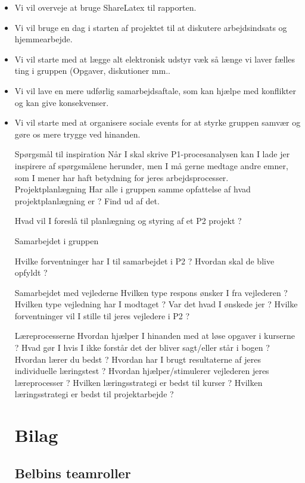 \documentclass[oneside,a4paper,titlepage]{article}
\begin{document}
\begin{itemize}
  \item Vi vil overveje at bruge ShareLatex til rapporten. 
  \item Vi vil bruge en dag i starten af projektet til at diskutere arbejdsindsats og hjemmearbejde. 
  \item Vi vil starte med at lægge alt elektronisk udstyr væk så længe vi laver fælles ting i gruppen (Opgaver, diskutioner mm.\).
  \item Vi vil lave en mere udførlig samarbejdsaftale, som kan hjælpe med konflikter og kan give konsekvenser. 
  \item Vi vil starte med at organisere sociale events for at styrke gruppen samvær og gøre os mere trygge ved hinanden.


Spørgsmål til inspiration
Når I skal skrive P1-procesanalysen kan I lade jer inspirere af spørgsmålene herunder, men I må
gerne medtage andre emner, som I mener har haft betydning for jeres arbejdsprocesser.
Projektplanlægning
Har alle i gruppen samme opfattelse af hvad projektplanlægning er ? Find ud af det.

Hvad vil I foreslå til planlægning og styring af et P2 projekt ?

Samarbejdet i gruppen

Hvilke forventninger har I til samarbejdet i P2 ? Hvordan skal de blive opfyldt ?

Samarbejdet med vejlederne
Hvilken type respons ønsker I fra vejlederen ?
Hvilken type vejledning har I modtaget ? Var det hvad I ønskede jer ?
Hvilke forventninger vil I stille til jeres vejledere i P2 ?

Læreprocesserne
Hvordan hjælper I hinanden med at løse opgaver i kurserne ?
Hvad gør I hvis I ikke forstår det der bliver sagt/eller står i bogen ?
Hvordan lærer du bedst ?
Hvordan har I brugt resultaterne af jeres individuelle læringstest ?
Hvordan hjælper/stimulerer vejlederen jeres læreprocesser ?
Hvilken læringsstrategi er bedst til kurser ?
Hvilken læringsstrategi er bedst til projektarbejde ?


\clearpage
\section{Bilag}

\subsection{Belbins teamroller}
\label{sec:styr_paa_projektet}

\end{itemize}
\end{document}
